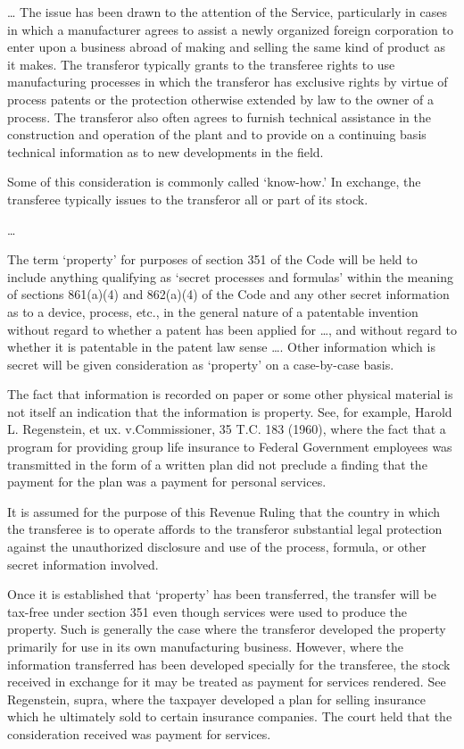 \begin{select}

\ldots
The issue has been drawn to the attention of the Service, particularly in cases in which a manufacturer agrees to assist a newly organized foreign corporation to enter upon a business abroad of making and selling the same kind of product as it makes. The transferor typically grants to the transferee rights to use manufacturing processes in which the transferor has exclusive rights by virtue of process patents or the protection otherwise extended by law to the owner of a process. The transferor also often agrees to furnish technical assistance in the construction and operation of the plant and to provide on a continuing basis technical information as to new developments in the field.

Some of this consideration is commonly called `know-how.' In exchange, the transferee typically issues to the transferor all or part of its stock.

\ldots

The term `property' for purposes of section 351 of the Code will be held to include anything qualifying as `secret processes and formulas' within the meaning of sections 861(a)(4) and 862(a)(4) of the Code and any other secret information as to a device, process, etc., in the general nature of a patentable invention without regard to whether a patent has been applied for \ldots, and without regard to whether it is patentable in the patent law sense \ldots. Other information which is secret will be given consideration as `property' on a case-by-case basis.

The fact that information is recorded on paper or some other physical material is not itself an indication that the information is property. See, for example, Harold L. Regenstein, et ux. v.\@ Commissioner, 35 T.C. 183 (1960), where the fact that a program for providing group life insurance to Federal Government employees was transmitted in the form of a written plan did not preclude a finding that the payment for the plan was a payment for personal services.

It is assumed for the purpose of this Revenue Ruling that the country in which the transferee is to operate affords to the transferor substantial legal protection against the unauthorized disclosure and use of the process, formula, or other secret information involved.

Once it is established that `property' has been transferred, the transfer will be tax-free under  section 351 even though services were used to produce the property. Such is generally the case where the transferor developed the property primarily for use in its own manufacturing business. However, where the information transferred has been developed specially for the transferee, the stock received in exchange for it may be treated as payment for services rendered. See Regenstein, supra, where the taxpayer developed a plan for selling insurance which he ultimately sold to certain insurance companies. The court held that the consideration received was payment for services.


\end{select}
